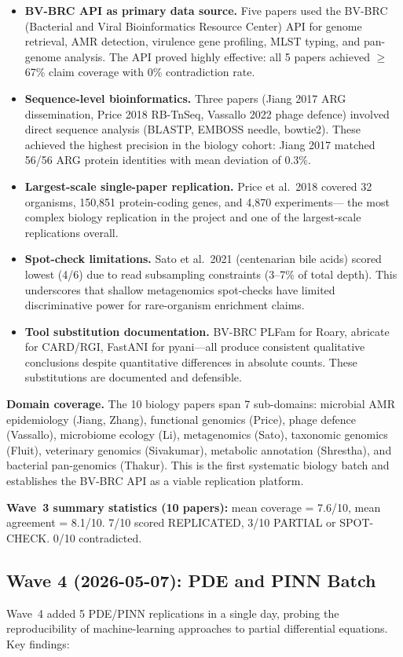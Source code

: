 \documentclass[11pt]{article}
\begin{document}
\begin{itemize}
\item \textbf{BV-BRC API as primary data source.} Five papers used the BV-BRC
(Bacterial and Viral Bioinformatics Resource Center) API for genome retrieval,
AMR detection, virulence gene profiling, MLST typing, and pan-genome
analysis. The API proved highly effective: all 5 papers achieved $\geq$67\%
claim coverage with 0\% contradiction rate.
\item \textbf{Sequence-level bioinformatics.} Three papers (Jiang 2017 ARG
dissemination, Price 2018 RB-TnSeq, Vassallo 2022 phage defence) involved
direct sequence analysis (BLASTP, EMBOSS needle, bowtie2). These achieved
the highest precision in the biology cohort: Jiang 2017 matched 56/56 ARG
protein identities with mean deviation of 0.3\%.
\item \textbf{Largest-scale single-paper replication.} Price et al.\ 2018
covered 32 organisms, 150,851 protein-coding genes, and 4,870 experiments---
the most complex biology replication in the project and one of the
largest-scale replications overall.
\item \textbf{Spot-check limitations.} Sato et al.\ 2021 (centenarian bile
acids) scored lowest (4/6) due to read subsampling constraints (3--7\% of
total depth). This underscores that shallow metagenomics spot-checks have
limited discriminative power for rare-organism enrichment claims.
\item \textbf{Tool substitution documentation.} BV-BRC PLFam for Roary,
abricate for CARD/RGI, FastANI for pyani---all produce consistent
qualitative conclusions despite quantitative differences in absolute counts.
These substitutions are documented and defensible.
\end{itemize}

\noindent\textbf{Domain coverage.} The 10 biology papers span 7 sub-domains:
microbial AMR epidemiology (Jiang, Zhang), functional genomics (Price),
phage defence (Vassallo), microbiome ecology (Li), metagenomics (Sato),
taxonomic genomics (Fluit), veterinary genomics (Sivakumar), metabolic
annotation (Shrestha), and bacterial pan-genomics (Thakur). This is the
first systematic biology batch and establishes the BV-BRC API as a viable
replication platform.

\noindent\textbf{Wave~3 summary statistics (10 papers):}
mean coverage = 7.6/10, mean agreement = 8.1/10.
7/10 scored REPLICATED, 3/10 PARTIAL or SPOT-CHECK.
0/10 contradicted.

\subsection{Wave 4 (2026-05-07): PDE and PINN Batch}
Wave~4 added 5 PDE/PINN replications in a single day, probing the
reproducibility of machine-learning approaches to partial differential
equations. Key findings:
\end{document}
